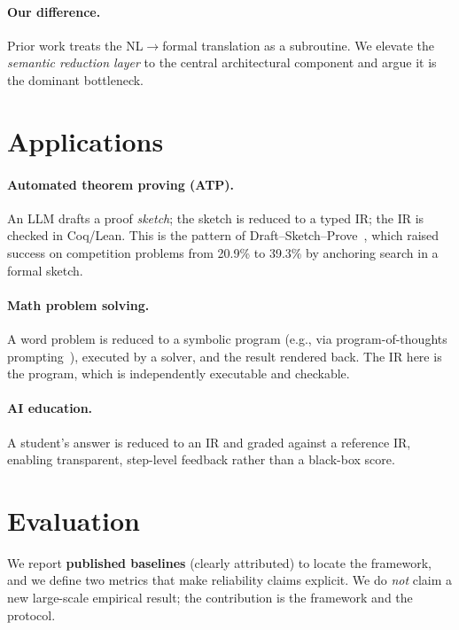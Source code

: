 \documentclass[11pt]{article}
\begin{document}
\paragraph{Our difference.}
Prior work treats the NL$\rightarrow$formal translation as a subroutine. We elevate the
\emph{semantic reduction layer} to the central architectural component and argue it is
the dominant bottleneck.

\section{Applications}
\label{sec:apps}

\paragraph{Automated theorem proving (ATP).}
An LLM drafts a proof \emph{sketch}; the sketch is reduced to a typed IR; the IR is
checked in Coq/Lean. This is the pattern of Draft--Sketch--Prove~\cite{jiang2023draft},
which raised success on competition problems from 20.9\% to 39.3\% by anchoring search
in a formal sketch.

\paragraph{Math problem solving.}
A word problem is reduced to a symbolic program (e.g., via program-of-thoughts
prompting~\cite{chen2022program}), executed by a solver, and the result rendered back.
The IR here is the program, which is independently executable and checkable.

\paragraph{AI education.}
A student's answer is reduced to an IR and graded against a reference IR, enabling
transparent, step-level feedback rather than a black-box score.

\section{Evaluation}
\label{sec:eval}

We report \textbf{published baselines} (clearly attributed) to locate the framework, and
we define two metrics that make reliability claims explicit. We do \emph{not} claim a
new large-scale empirical result; the contribution is the framework and the protocol.
\end{document}
